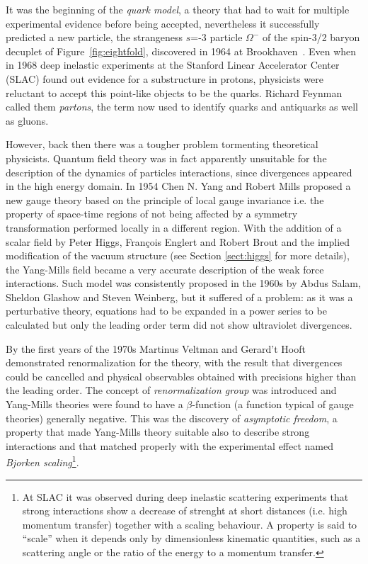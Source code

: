It was the beginning of the {\it quark model}, a theory that had to 
wait for multiple experimental evidence before being accepted,
nevertheless it successfully predicted a new particle, the strangeness $s$=-3 
particle $\Omega^{-}$ of the spin-3/2 baryon decuplet of Figure~\ref{fig:eightfold},
discovered in 1964 at Brookhaven~\cite{PhysRevLett.12.204}. 
Even when in 1968 deep inelastic experiments at the Stanford 
Linear Accelerator Center (SLAC) found out evidence for a 
substructure in protons, physicists were reluctant to accept 
this point-like objects to be the quarks. Richard Feynman called 
them \textit{partons}, the term now used to identify quarks 
and antiquarks as well as gluons.

However, back then there was a tougher problem tormenting theoretical physicists. 
Quantum field theory was in fact apparently unsuitable for the description 
of the dynamics of particles interactions, since divergences appeared in the 
high energy domain. In 1954 Chen N. Yang and Robert Mills proposed a new gauge 
theory based on the principle of local gauge invariance i.e. the property of 
space-time regions of not being affected by a symmetry transformation performed 
locally in a different region. With the addition of a scalar field by Peter Higgs, 
Fran\c{c}ois Englert and Robert Brout and the implied modification of the vacuum 
structure (see Section \ref{sect:higgs} for more details), the Yang-Mills field 
became a very accurate description of the weak force interactions. Such model was 
consistently proposed in the 1960s by Abdus Salam, Sheldon Glashow and Steven 
Weinberg, but it suffered of a problem: as it was a perturbative theory, equations 
had to be expanded in a power series to be calculated but only the leading order 
term did not show ultraviolet divergences.

By the first years of the 1970s Martinus Veltman and Gerard't Hooft demonstrated 
renormalization for the theory, with the result that divergences could be 
cancelled and physical observables obtained with precisions higher than the 
leading order. 
The concept of \textit{renormalization group} was introduced and Yang-Mills theories were found to have a $\beta$-function (a function typical of gauge theories) generally negative. This was the discovery of \textit{asymptotic freedom}, a property that made Yang-Mills theory suitable also to describe strong interactions and that matched properly with the experimental effect named \textit{Bjorken scaling}\footnote{At SLAC it was observed during deep inelastic scattering experiments that strong interactions show a decrease of strenght at short distances (i.e. high momentum transfer) together with a scaling behaviour. A property is said to ``scale'' when it depends only by dimensionless kinematic quantities, such as a scattering angle or the ratio of the energy to a momentum transfer.}. 

